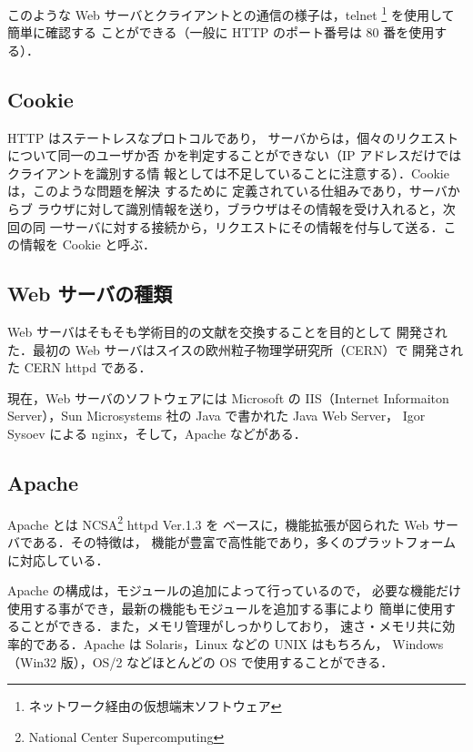 このような Web サーバとクライアントとの通信の様子は，telnet%
\footnote{ネットワーク経由の仮想端末ソフトウェア} %
を使用して簡単に確認する
ことができる（一般に HTTP のポート番号は 80 番を使用する）．


\subsection*{Cookie}
HTTP はステートレスなプロトコルであり，
サーバからは，個々のリクエストについて同一のユーザか否
かを判定することができない（IP アドレスだけではクライアントを識別する情
報としては不足していることに注意する）．Cookie は，このような問題を解決
するために
定義されている仕組みであり，サーバからブ
ラウザに対して識別情報を送り，ブラウザはその情報を受け入れると，次回の同
一サーバに対する接続から，リクエストにその情報を付与して送る．この情報を
Cookie と呼ぶ．


\subsection{Web サーバの種類}
Web サーバはそもそも学術目的の文献を交換することを目的として
開発された．最初の Web サーバはスイスの欧州粒子物理学研究所（CERN）で
開発された CERN httpd である．

現在，Web サーバのソフトウェアには Microsoft の IIS（Internet Informaiton
Server），Sun Microsystems 社の Java で書かれた Java Web Server，
Igor Sysoev による nginx，そして，Apache などがある．

\subsection*{Apache}

Apache とは NCSA\footnote{National Center Supercomputing} httpd Ver.1.3 を
ベースに，機能拡張が図られた Web サーバである．その特徴は，
機能が豊富で高性能であり，多くのプラットフォームに対応している．

Apache の構成は，モジュールの追加によって行っているので，
必要な機能だけ使用する事ができ，最新の機能もモジュールを追加する事により
簡単に使用することができる．また，メモリ管理がしっかりしており，
速さ・メモリ共に効率的である．Apache は Solaris，Linux などの UNIX はもちろん，
Windows（Win32 版），OS/2 などほとんどの OS で使用することができる．

